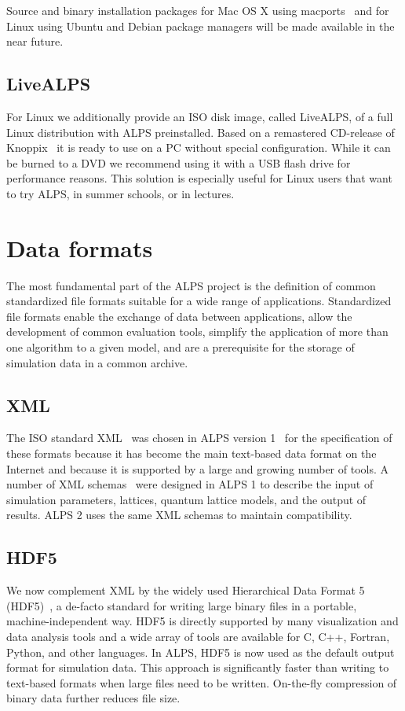 \documentclass[12pt]{iopart}
\begin{document}
Source and binary installation packages for Mac OS X using macports~\cite{macports} and for Linux using Ubuntu and Debian package managers will be made available in the near future.


\subsection{LiveALPS}

For Linux we additionally provide an ISO disk image, called LiveALPS, of a full Linux distribution with ALPS preinstalled. 
Based on a remastered CD-release of Knoppix~\cite{knoppix} it is ready to use 
on a PC without special configuration. While it can be burned to a DVD we recommend using it with a USB flash drive for performance reasons.
This solution is especially useful for Linux users that want to try ALPS, in summer schools, or in lectures.

\section{Data formats}

The most fundamental part of the ALPS project is the definition of
common standardized file formats suitable for a wide range of
applications. Standardized file formats enable the exchange of data
between applications, allow the development of common evaluation
tools, simplify the application of more than one algorithm to a given
model, and are a prerequisite for the storage of simulation data in a
common archive.

\subsection{XML}
 The ISO
standard XML~\cite{xml} was chosen in ALPS version 1~\cite{ALPS1.2,ALPS1.3} for the specification of these formats
because it has become
the main text-based data format on the Internet and because it is
supported by a large and growing number of tools.
A number of XML schemas~\cite{xmlschema} were designed in ALPS 1 to describe the input of simulation parameters, lattices, quantum lattice models, and the output of results. ALPS 2 uses the same XML schemas to maintain compatibility.

\subsection{HDF5}

We now complement XML by the widely used Hierarchical Data Format 5 (HDF5)~\cite{hdf5}, a de-facto standard for writing large binary files in a portable, machine-independent way. HDF5 is directly supported by many visualization and data analysis tools and a wide array of tools are 
available for C, C++, Fortran, Python, and other languages. In ALPS, HDF5 is now used as the default output format for simulation data. This approach is significantly faster than writing to text-based formats when large files need to be written. On-the-fly compression of binary data further reduces file size. 
\end{document}
